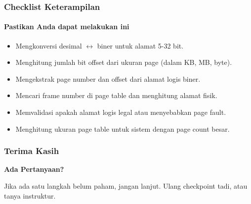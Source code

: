 \documentclass[t,aspectratio=169,xcolor=dvipsnames]{beamer}
\begin{document}
\begin{frame}
    \frametitle{Checklist Keterampilan}
    \framesubtitle{Pastikan Anda dapat melakukan ini}
    \small

    \begin{itemize}
        \item[$\square$] Mengkonversi desimal $\leftrightarrow$ biner untuk alamat 5-32 bit.
        \item[$\square$] Menghitung jumlah bit offset dari ukuran page (dalam KB, MB, byte).
        \item[$\square$] Mengekstrak page number dan offset dari alamat logis biner.
        \item[$\square$] Mencari frame number di page table dan menghitung alamat fisik.
        \item[$\square$] Memvalidasi apakah alamat logis legal atau menyebabkan page fault.
        \item[$\square$] Menghitung ukuran page table untuk sistem dengan page count besar.
    \end{itemize}
\end{frame}

\begin{frame}
    \frametitle{Terima Kasih}
    \begin{center}
        \Huge \textbf{Ada Pertanyaan?}

        \vspace{0.8cm}
        \normalsize
        Jika ada satu langkah belum paham, jangan lanjut. Ulang checkpoint tadi, atau tanya instruktur.
    \end{center}
\end{frame}
\end{document}
